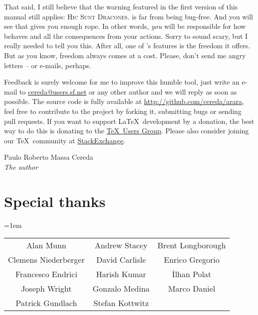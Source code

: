 \documentclass[a4paper,twoside,12pt]{memoir}
\begin{document}
That said, I still believe that the warning featured in the first version of this manual still applies: \textsc{Hic Sunt Dracones}. \arara is far from being bug-free. And you will see that \arara gives you enough rope. In other words, \emph{you} will be responsible for how \arara behaves and all the consequences from your actions. Sorry to sound scary, but I really needed to tell you this. After all, one of \arara's features is the freedom it offers. But as you know, freedom always comes at a cost. Please, don't send me angry letters -- or e-mails, perhaps.

Feedback is surely welcome for me to improve this humble tool, just write an 
e-mail to \url{cereda@users.sf.net} or any other author and we will reply as soon as possible. The source code is fully available at \url{http://github.com/cereda/arara}, feel free to contribute to the project by forking it, submitting bugs or sending pull requests. If you want to support \LaTeX\ development by a donation, the best way to do this is donating to the \href{http://www.tug.org/}{\TeX\ Users Group}. Please also  consider joining our \TeX\ community at \href{http://tex.stackexchange.com}{StackExchange}.

\vfill

\begin{flushright}
Paulo Roberto Massa Cereda\\
\emph{The author}
\end{flushright}

\cleardoublepage

\section*{Special thanks}

{\tabcolsep=1em
\renewcommand{\arraystretch}{1.5}
\begin{tabular}{ccc}
Alan Munn & Andrew Stacey & Brent Longborough\\
Clemens Niederberger & David Carlisle & Enrico Gregorio\\
Francesco Endrici & Harish Kumar & \.Ilhan Polat\\
Joseph Wright & Gonzalo Medina & Marco Daniel\\
Patrick Gundlach & Stefan Kottwitz &
\end{tabular}}

\vspace{1em}
\end{document}
